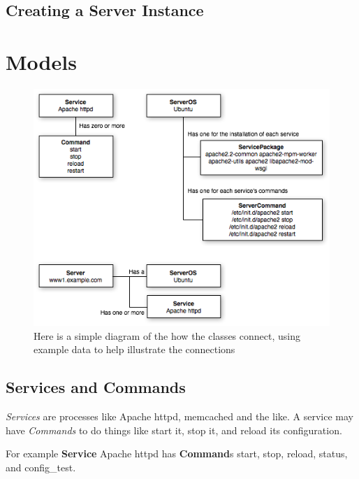 \documentclass[letterpaper,10pt,english]{manual}
\begin{document}
\resetcurrentobjects
\hypertarget{--doc-gettingstarted/creating_servers}{}

\hypertarget{gettingstarted-creating-servers}{}\section{Creating a Server Instance}

\resetcurrentobjects
\hypertarget{--doc-models}{}

\hypertarget{models}{}\chapter{Models}
\begin{figure}[htbp]
\centering

\includegraphics{OMG_schema_example1.png}
\caption{Here is a simple diagram of the how the classes connect, using example data
to help illustrate the connections}\end{figure}


\hypertarget{models-service}{}\section{Services and Commands}

\emph{Services} are processes like Apache httpd, memcached and the like. A service may have \emph{Commands} to do things like start it, stop it, and reload its configuration.

For example \textbf{Service} Apache httpd has \textbf{Command}s start, stop, reload, status, and config\_test.
\end{document}
